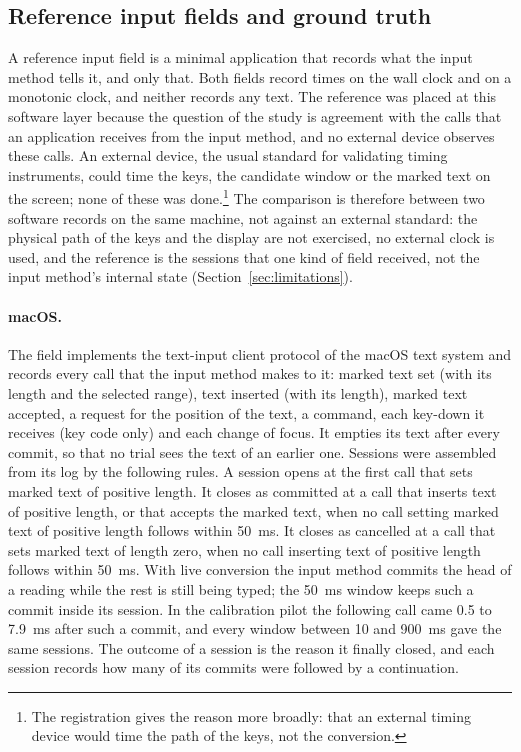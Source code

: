 \subsection{Reference input fields and ground truth}
\label{sec:method-reference}

A reference input field is a minimal application that records what the input method tells it, and only that. Both
fields record times on the wall clock and on a monotonic clock, and neither records any text. The reference was placed
at this software layer because the question of the study is agreement with the calls that an application receives
from the input method, and no external device observes these calls. An external device, the usual standard for
validating timing instruments, could time the keys, the candidate window or the marked text on the screen; none of
these was done.\footnote{The registration gives the reason more broadly: that an external timing device would time
the path of the keys, not the conversion.} The comparison is therefore between two software records on the same
machine, not against an external standard: the physical path of the keys and the display are not exercised, no
external clock is used, and the reference is the sessions that one kind of field received, not the input method's
internal state (Section~\ref{sec:limitations}).

\paragraph{macOS.} The field implements the text-input client protocol of the macOS text system and records every call
that the input method makes to it: marked text set (with its length and the selected range), text inserted (with its
length), marked text accepted, a request for the position of the text, a command, each key-down it receives (key code
only) and each change of focus. It empties its text after every commit, so that no trial sees the text of an earlier
one. Sessions were assembled from its log by the following rules. A session opens at the first call that sets marked
text of positive length. It closes as committed at a call that inserts text of positive length, or that accepts the
marked text, when no call setting marked text of positive length follows within 50~ms. It closes as cancelled at a
call that sets marked text of length zero, when no call inserting text of positive length follows within 50~ms. With
live conversion the input method commits the head of a reading while the rest is still being typed; the 50~ms window
keeps such a commit inside its session. In the calibration pilot the following call came 0.5 to 7.9~ms after such a
commit, and every window between 10 and 900~ms gave the same sessions. The outcome of a session is the reason it
finally closed, and each session records how many of its commits were followed by a continuation.

